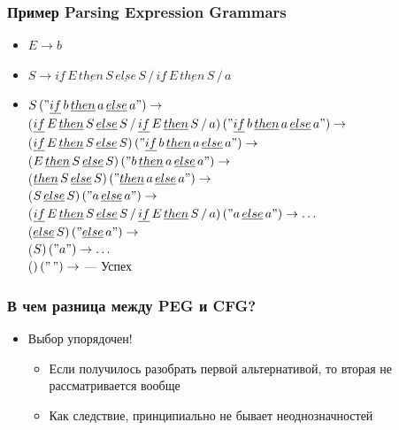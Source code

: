\documentclass{beamer}
\begin{document}
\begin{frame}[fragile]
  \transwipe[direction=90]
  \frametitle{Пример Parsing Expression Grammars}
  \begin{itemize}
    \item $E \rightarrow b $
    \item $S \rightarrow \underline{if} \, E \, \underline{then} \, S \, \underline{else} \, S \, / \, \underline{if} \, E \, \underline{then} \, S \, / \, a$    
  \end{itemize}
  
  \begin{itemize}
    \item $S \, ("\underline{if} \, b \, \underline{then} \, a \, \underline{else} \, a") \rightarrow $ \\
     ($\underline{if} \, E \, \underline{then} \, S \, \underline{else} \, S \, / \, \underline{if} \, E \, \underline{then} \, S \, / \, a) \, ("\underline{if} \, b \, \underline{then} \, a \, \underline{else} \, a") \rightarrow $ \\  
     ($\underline{if} \, E \, \underline{then} \, S \, \underline{else} \, S) \, ("\underline{if} \, b \, \underline{then} \, a \, \underline{else} \, a") \rightarrow $ \\
     ($E \, \underline{then} \, S \, \underline{else} \, S) \, ("b \, \underline{then} \, a \, \underline{else} \, a") \rightarrow $ \\ 
     ($\underline{then} \, S \, \underline{else} \, S) \, ("\underline{then} \, a \, \underline{else} \, a") \rightarrow $ \\ 
     ($S \, \underline{else} \, S) \, ("a \, \underline{else} \, a") \rightarrow $ \\   
     ($\underline{if} \, E \, \underline{then} \, S \, \underline{else} \, S \, / \, \underline{if} \, E \, \underline{then} \, S \, / \, a) \, ("a \, \underline{else} \, a") \rightarrow \dots $ \\   
     ($\underline{else} \, S) \, ("\underline{else} \, a") \rightarrow $ \\   
     ($S) \, ("a") \rightarrow \dots $ \\
     ($) \, ("\,") \rightarrow $  --- Успех        
  \end{itemize}
\end{frame}

\begin{frame}[fragile]
  \transwipe[direction=90]
  \frametitle{В чем разница между PEG и CFG?}
  \begin{itemize}
    \item Выбор упорядочен!
    \begin{itemize}
      \item Если получилось разобрать первой альтернативой, то вторая не рассматривается вообще
      \item Как следствие, принципиально не бывает неоднозначностей 
    \end{itemize}
  \end{itemize}
\end{frame}
\end{document}

